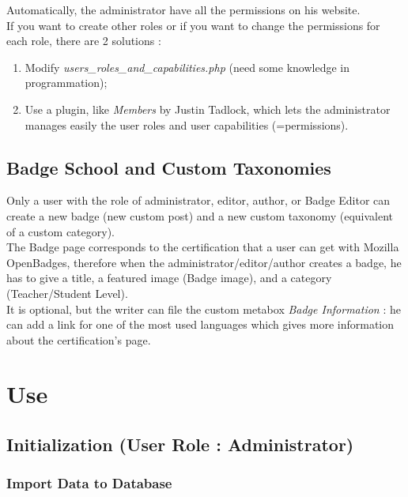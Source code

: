 \documentclass[a4paper, 12pt]{report}
\begin{document}
	Automatically, the administrator have all the permissions on his website.\\
	
	If you want to create other roles or if you want to change the permissions for each role, there are 2 solutions :
	\begin{enumerate}
		\item Modify \textit{users\_roles\_and\_capabilities.php} (need some knowledge in programmation);
		\item Use a plugin, like \textit{Members} by Justin Tadlock, which lets the administrator manages easily the user roles and user capabilities (=permissions).
	\end{enumerate}
	
		\section{Badge School and Custom Taxonomies}
		
	Only a user with the role of administrator, editor, author, or Badge Editor can create a new badge (new custom post) and a new custom taxonomy (equivalent of a custom category).\\
	
	The Badge page corresponds to the certification that a user can get with Mozilla OpenBadges, therefore when the administrator/editor/author creates a badge, he has to give a title, a featured image (Badge image), and a category (Teacher/Student Level). \\
	
	It is optional, but the writer can file the custom metabox \textit{Badge Information} : he can add a link for one of the most used languages which gives more information about the certification's page.
	
	
	
	
	
	\chapter{Use}
	
		\section{Initialization (User Role : Administrator)}
		
			\subsection{Import Data to Database}
		
\end{document}

